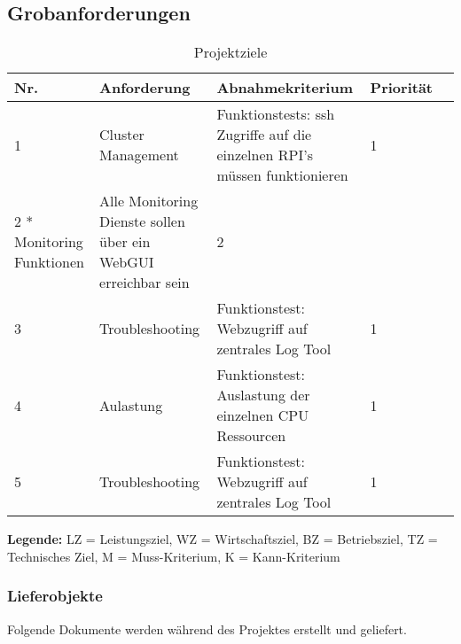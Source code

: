 \newpage
\subsection{Grobanforderungen} 
\label{sec:Grobanforderung
}

\begin{table}[H]
\begin{tabular}[t]{p{0.7cm}|p{6.1cm}p{6.1cm}p{1cm}c}
\hline
\rowcolor{heading}\textbf{Nr.} & \textbf{Anforderung} & \textbf{Abnahmekriterium} & \textbf{Priorität} \\\hline
1 & Cluster Management & Funktionstests: ssh Zugriffe auf die einzelnen RPI’s müssen funktionieren & 1 \\\hline
2 * Monitoring Funktionen & Alle Monitoring Dienste sollen über ein WebGUI erreichbar sein & 2 \\\hline
3 & Troubleshooting & Funktionstest: Webzugriff auf zentrales Log Tool & 1 \\\hline
4 & Aulastung & Funktionstest: Auslastung der einzelnen CPU Ressourcen & 1 \\\hline
5 & Troubleshooting & Funktionstest: Webzugriff auf zentrales Log Tool & 1 \\\hline
\end{tabular}
\caption{Projektziele}
\end{table}

\textbf{Legende:} LZ = Leistungsziel, WZ = Wirtschaftsziel, BZ = Betriebsziel, TZ = Technisches Ziel, \newline M = Muss-Kriterium, K = Kann-Kriterium

\subsubsection{Lieferobjekte}
Folgende Dokumente werden während des Projektes erstellt und geliefert.

